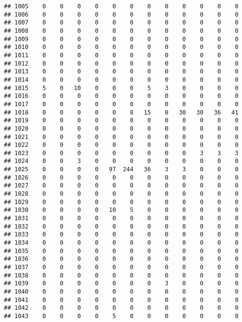 \documentclass[]{article}
\begin{document}
\begin{verbatim}
## 1005    0    0    0    0    0    0    0    0    0    0    0    0
## 1006    0    0    0    0    0    0    0    0    0    0    0    0
## 1007    0    0    0    0    0    0    0    0    0    0    0    0
## 1008    0    0    0    0    0    0    0    0    0    0    0    0
## 1009    0    0    0    0    0    0    0    0    0    0    0    0
## 1010    0    0    0    0    0    0    0    0    0    0    0    0
## 1011    0    0    0    0    0    0    0    0    0    0    0    0
## 1012    0    0    0    0    0    0    0    0    0    0    0    0
## 1013    0    0    0    0    0    0    0    0    0    0    0    0
## 1014    0    0    0    0    0    0    0    0    0    0    0    0
## 1015    5    0   10    0    0    0    5    3    0    0    0    0
## 1016    0    0    0    0    0    0    0    0    0    0    0    0
## 1017    0    0    0    0    0    0    0    0    0    0    0    0
## 1018    0    0    0    0    0    8   15    8   30   30   36   41
## 1019    0    0    0    0    0    0    0    0    0    0    0    0
## 1020    0    0    0    0    0    0    0    0    0    0    0    0
## 1021    0    0    0    0    0    0    0    0    0    0    0    0
## 1022    0    0    0    0    0    0    0    0    0    0    0    0
## 1023    0    0    0    0    0    0    0    0    0    3    3    3
## 1024    0    0    3    0    0    0    0    0    0    0    0    0
## 1025    0    0    0    0   97  244   36    3    3    0    0    0
## 1026    0    0    0    0    0    0    0    0    0    0    0    0
## 1027    0    0    0    0    0    0    0    0    0    0    0    0
## 1028    0    0    0    0    0    0    0    0    0    0    0    0
## 1029    0    0    0    0    0    0    0    0    0    0    0    0
## 1030    0    0    0    0   10    5    0    0    0    0    0    0
## 1031    0    0    0    0    0    0    0    0    0    0    0    0
## 1032    0    0    0    0    0    0    0    0    0    0    0    0
## 1033    0    0    0    0    0    0    0    0    0    0    0    0
## 1034    0    0    0    0    0    0    0    0    0    0    0    0
## 1035    0    0    0    0    0    0    0    0    0    0    0    0
## 1036    0    0    0    0    0    0    0    0    0    0    0    0
## 1037    0    0    0    0    0    0    0    0    0    0    0    0
## 1038    0    0    0    0    0    0    0    0    0    0    0    0
## 1039    0    0    0    0    0    0    0    3    0    0    0    0
## 1040    0    0    0    0    0    0    0    0    0    0    0    0
## 1041    0    0    0    0    0    0    0    0    0    0    0    0
## 1042    0    0    0    0    0    0    0    0    0    0    0    0
## 1043    0    0    0    0    5    0    0    0    0    0    0    0

\end{verbatim}
\end{document}
